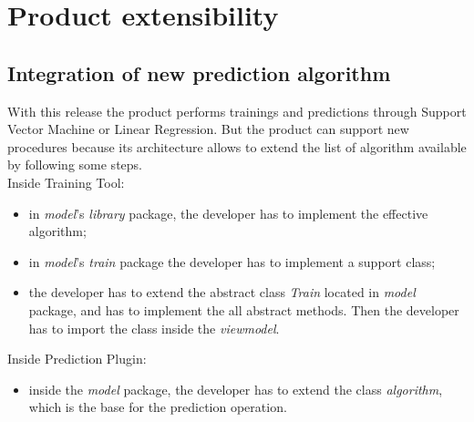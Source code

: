 \section{Product extensibility}
\subsection{Integration of new prediction algorithm}
With this release the product performs trainings and predictions through Support Vector Machine or Linear Regression. But the product can support new procedures because its architecture allows to extend the list of algorithm available by following some steps.\\
Inside Training Tool:
\begin{itemize}
\item in \textit{model}'s \textit{library} package, the developer has to implement the effective algorithm;
\item in \textit{model}'s \textit{train} package the developer has to implement a support class;
\item the developer has to extend the abstract class \textit{Train} located in \textit{model} package, and has to implement the all abstract methods. Then the developer has to import the class inside the \textit{viewmodel}.
\end{itemize}
Inside Prediction Plugin:
\begin{itemize}
\item inside the \textit{model} package, the developer has to extend the class \textit{algorithm}, which is the base for the prediction operation.
\end{itemize}
